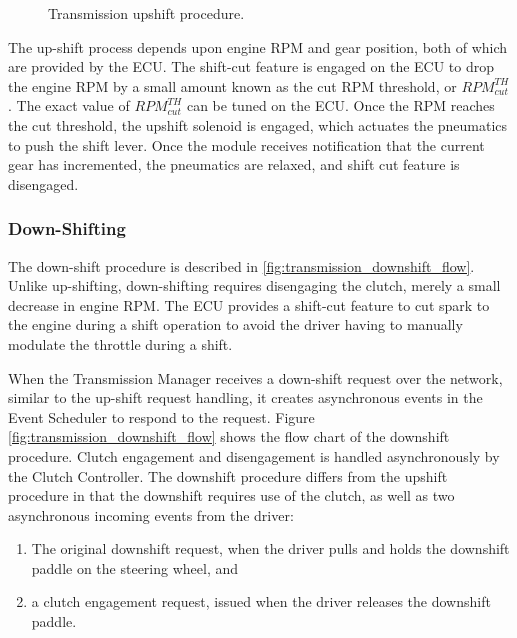 \begin{figure}[H]
	\centering
	
	\caption{Transmission upshift procedure.}
	\label{fig:transmission_upshift_flow}
\end{figure}

The up-shift process depends upon engine RPM and gear position, both of which are provided by the ECU. The shift-cut feature is engaged on the ECU to drop the engine RPM by a small amount known as the cut RPM threshold, or $RPM^{TH}_{cut}$. The exact value of $RPM^{TH}_{cut}$ can be tuned on the ECU. Once the RPM reaches the cut threshold, the upshift solenoid is engaged, which actuates the pneumatics to push the shift lever. Once the module receives notification that the current gear has incremented, the pneumatics are relaxed, and shift cut feature is disengaged.


\subsubsection{Down-Shifting}

The down-shift procedure is described in \ref{fig:transmission_downshift_flow}. Unlike up-shifting, down-shifting requires disengaging the clutch, merely a small decrease in engine RPM. The ECU provides a shift-cut feature to cut spark to the engine during a shift operation to avoid the driver having to manually modulate the throttle during a shift.

When the Transmission Manager receives a down-shift request over the network, similar to the up-shift request handling, it creates asynchronous events in the Event Scheduler to respond to the request. Figure \ref{fig:transmission_downshift_flow} shows the flow chart of the downshift procedure. Clutch engagement and disengagement is handled asynchronously by the Clutch Controller. The downshift procedure differs from the upshift procedure in that the downshift requires use of the clutch, as well as two asynchronous incoming events from the driver:

\begin{enumerate}
  \item The original downshift request, when the driver pulls and holds the downshift paddle on the steering wheel, and
  \item a clutch engagement request, issued when the driver releases the downshift paddle.
\end{enumerate}

